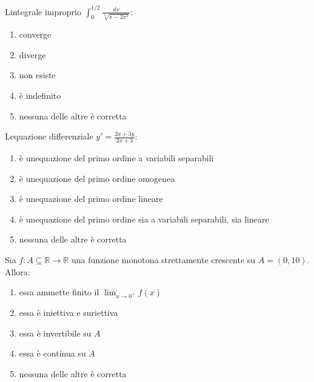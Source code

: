\begin{quiz}
L\textquotesingle integrale improprio $\displaystyle\int_0^{1/2}\frac{dx}{\sqrt[3]{x-2x^2}}$:
\begin{enumerate}
\item converge
\item diverge
\item non esiste
\item \`e indefinito
\item nessuna delle altre \`e corretta
\end{enumerate}
\end{quiz}

\begin{quiz}
L\textquotesingle equazione differenziale $\displaystyle y\prime=\frac{2x+3y}{2x+3}$:
\begin{enumerate}
\item \`e un\textquotesingle equazione del primo ordine a variabili separabili
\item \`e un\textquotesingle equazione del primo ordine omogenea
\item \`e un\textquotesingle equazione del primo ordine lineare
\item \`e un\textquotesingle equazione del primo ordine sia a variabili separabili, sia lineare
\item nessuna delle altre \`e corretta
\end{enumerate}
\end{quiz}

\begin{quiz}
Sia $f:A\subseteq\mathbb R\to\mathbb R$ una funzione monotona strettamente crescente su $A=(0,10)$. Allora:
\begin{enumerate}
\item essa ammette finito il $\lim_{x\to0^+}f(x)$
\item essa \`e iniettiva e suriettiva
\item essa \`e invertibile su $A$
\item essa \`e continua su $A$
\item nessuna delle altre \`e corretta
\end{enumerate}
\end{quiz}

